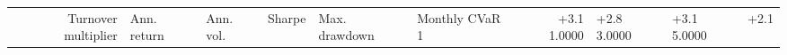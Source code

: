 \begin{tabular}{rllrllrl}
\toprule
Turnover multiplier & Ann. return & Ann. vol. & Sharpe & Max. drawdown & Monthly CVaR 1%
 & +3.1%
1.0000 & +2.8%
3.0000 & +3.1%
5.0000 & +2.1%
\bottomrule
\end{tabular}
